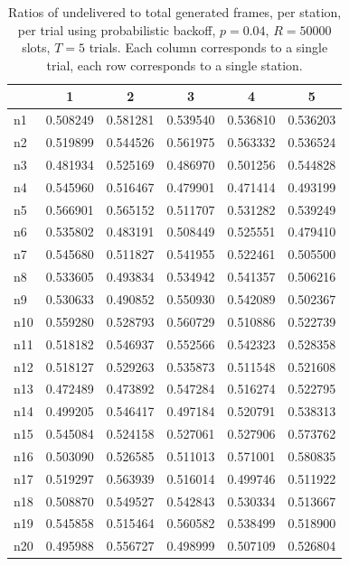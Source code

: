 \documentclass[twocolumn]{article}
\begin{document}
\begin{table}
    \centering 
    \label{fig:fairness_pb}
    \begin{tabular}{l|c|c|c|c|c}
           & 1 & 2 & 3 & 4 & 5 \\
        \hline
        n1 & 0.508249 & 0.581281 & 0.539540  & 0.536810 & 0.536203 \\
        n2 & 0.519899 & 0.544526 & 0.561975  & 0.563332 & 0.536524 \\
        n3 & 0.481934 & 0.525169 & 0.486970  & 0.501256 & 0.544828 \\
        n4 & 0.545960 & 0.516467 & 0.479901  & 0.471414 & 0.493199 \\
        n5 & 0.566901 & 0.565152 & 0.511707  & 0.531282 & 0.539249 \\
        n6 & 0.535802 & 0.483191 & 0.508449  & 0.525551 & 0.479410 \\
        n7 & 0.545680 & 0.511827 & 0.541955  & 0.522461 & 0.505500 \\
        n8 & 0.533605 & 0.493834 & 0.534942  & 0.541357 & 0.506216 \\
        n9 & 0.530633 & 0.490852 & 0.550930  & 0.542089 & 0.502367 \\
       n10 & 0.559280 & 0.528793 & 0.560729  & 0.510886 & 0.522739 \\
       n11 & 0.518182 & 0.546937 & 0.552566  & 0.542323 & 0.528358 \\
       n12 & 0.518127 & 0.529263 & 0.535873  & 0.511548 & 0.521608 \\
       n13 & 0.472489 & 0.473892 & 0.547284  & 0.516274 & 0.522795 \\
       n14 & 0.499205 & 0.546417 & 0.497184  & 0.520791 & 0.538313 \\
       n15 & 0.545084 & 0.524158 & 0.527061  & 0.527906 & 0.573762 \\
       n16 & 0.503090 & 0.526585 & 0.511013  & 0.571001 & 0.580835 \\
       n17 & 0.519297 & 0.563939 & 0.516014  & 0.499746 & 0.511922 \\
       n18 & 0.508870 & 0.549527 & 0.542843  & 0.530334 & 0.513667 \\
       n19 & 0.545858 & 0.515464 & 0.560582  & 0.538499 & 0.518900 \\
       n20 & 0.495988 & 0.556727 & 0.498999  & 0.507109 & 0.526804
    \end{tabular}
    \caption{ Ratios of undelivered to total generated frames, per station, per trial using
       probabilistic backoff, $p=0.04$, $R=50000$ slots, $T = 5$ trials.
    Each column corresponds to a single trial, each row corresponds to a single station. }

\end{table}
\end{document}
